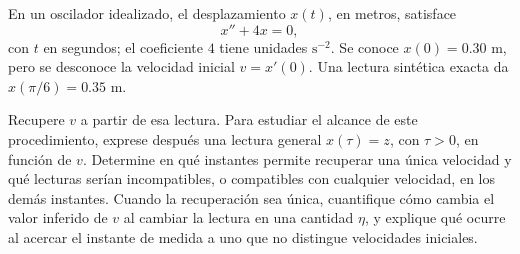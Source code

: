 En un oscilador idealizado, el desplazamiento \(x(t)\), en metros, satisface
\[
x''+4x=0,
\]
con \(t\) en segundos; el coeficiente \(4\) tiene unidades \(\mathrm s^{-2}\). Se conoce \(x(0)=0.30\) m, pero se desconoce la velocidad inicial \(v=x'(0)\). Una lectura sintética exacta da \(x(\pi/6)=0.35\) m.

Recupere \(v\) a partir de esa lectura. Para estudiar el alcance de este procedimiento, exprese después una lectura general \(x(\tau)=z\), con \(\tau>0\), en función de \(v\). Determine en qué instantes permite recuperar una única velocidad y qué lecturas serían incompatibles, o compatibles con cualquier velocidad, en los demás instantes. Cuando la recuperación sea única, cuantifique cómo cambia el valor inferido de \(v\) al cambiar la lectura en una cantidad \(\eta\), y explique qué ocurre al acercar el instante de medida a uno que no distingue velocidades iniciales.
